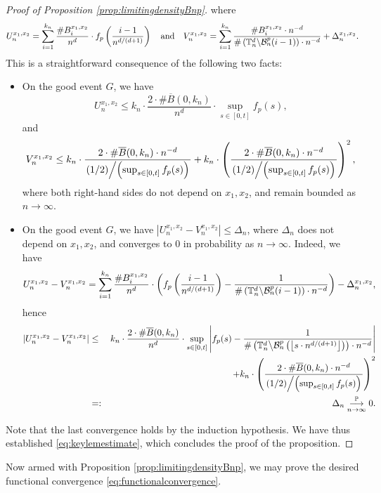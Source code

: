 \documentclass[a4paper,11pt]{article}
\begin{document}
\begin{proof}[Proof of Proposition \ref{prop:limitingdensityBnp}]
where
\[U_n^{x_1,x_2}=\sum_{i=1}^{k_n}\frac{\#B_i^{x_1,x_2}}{n^d}\cdot f_p\left(\frac{i-1}{n^{d/(d+1)}}\right)\quad\text{and}\quad V_n^{x_1,x_2}=\sum_{i=1}^{k_n}\frac{\#B_i^{x_1,x_2}\cdot n^{-d}}{\#\left(\mathbb{T}_n^d\middle\backslash\mathcal{B}_n^p(i-1)\right)\cdot n^{-d}}+\Delta_n^{x_1,x_2}.\]
This is a straightforward consequence of the following two facts:
\begin{itemize}
\item  On the good event $G$, we have
\[U_n^{x_1,x_2}\leq k_n\cdot\frac{2\cdot\#\overline{B}(0,k_n)}{n^d}\cdot\sup_{s\in[0,t]}f_p(s),\]
and
\[V_n^{x_1,x_2}\leq k_n\cdot\frac{2\cdot\#\overline{B}(0,k_n)\cdot n^{-d}}{\left.(1/2)\middle/\left(\sup_{s\in[0,t]}f_p(s)\right)\right.}+k_n\cdot\left(\frac{2\cdot\#\overline{B}(0,k_n)\cdot n^{-d}}{\left.(1/2)\middle/\left(\sup_{s\in[0,t]}f_p(s)\right)\right.}\right)^2,\]
where both right-hand sides do not depend on $x_1,x_2$, and remain bounded as $n\to\infty$.

\item On the good event $G$, we have $\left|U_n^{x_1,x_2}-V_n^{x_1,x_2}\right|\leq\Delta_n$, where $\Delta_n$ does not depend on $x_1,x_2$, and converges to $0$ in probability as $n\to\infty$.
Indeed, we have
\[U_n^{x_1,x_2}-V_n^{x_1,x_2}=\sum_{i=1}^{k_n}\frac{\#B_i^{x_1,x_2}}{n^d}\cdot\left(f_p\left(\frac{i-1}{n^{d/(d+1)}}\right)-\frac{1}{\#\left(\mathbb{T}_n^d\middle\backslash\mathcal{B}_n^p(i-1)\right)\cdot n^{-d}}\right)-\Delta_n^{x_1,x_2},\]
hence
\begin{eqnarray*}
\left|U_n^{x_1,x_2}-V_n^{x_1,x_2}\right|&\leq&k_n\cdot\frac{2\cdot\#\overline{B}(0,k_n)}{n^d}\cdot\sup_{s\in[0,t]}\left|f_p(s)-\frac{1}{\#\left(\mathbb{T}_n^d\middle\backslash\mathcal{B}_n^p\left(\left\lfloor s\cdot n^{d/(d+1)}\right\rfloor\right)\right)\cdot n^{-d}}\right|\\
&&+k_n\cdot\left(\frac{2\cdot\#\overline{B}(0,k_n)\cdot n^{-d}}{\left.(1/2)\middle/\left(\sup_{s\in[0,t]}f_p(s)\right)\right.}\right)^2\\
&=:&\Delta_n\underset{n\to\infty}{\overset{\mathbb{P}}{\longrightarrow}}0.
\end{eqnarray*}
\end{itemize}
Note that the last convergence holds by the induction hypothesis.
We have thus established \eqref{eq:keylemestimate}, which concludes the proof of the proposition.
\end{proof}

Now armed with Proposition \ref{prop:limitingdensityBnp}, we may prove the desired functional convergence \eqref{eq:functionalconvergence}.
\end{document}
